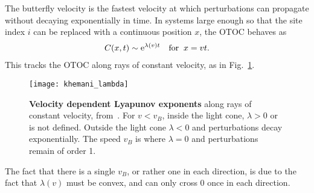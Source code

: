 The butterfly velocity is the fastest velocity at which perturbations can propagate without decaying exponentially in time. In systems large enough so that the site index $i$ can be replaced with a continuous position $x$, the OTOC behaves as~\cite{Khemani2018}
\begin{align}
C(x,t)\sim \text{e}^{\lambda(v)t}\quad\text{for}\;\;x=vt.\label{eqn:butterfly}
\end{align}
This tracks the OTOC along rays of constant velocity, as in Fig.~\ref{fig:khemani_lambda}.
\begin{figure}
	\centering
	\texttt{[image: khemani\_lambda]}
	\caption{\textbf{Velocity dependent Lyapunov exponents} along rays of constant velocity, from~\cite{Khemani2018}. For $v<v_B$, inside the light cone, $\lambda>0$ or is not defined. Outside the light cone $\lambda<0$ and perturbations decay exponentially. The speed $v_B$ is where $\lambda=0$ and perturbations remain of order 1.}
	\label{fig:khemani_lambda}
\end{figure}
The fact that there is a single $v_B$, or rather one in each direction, is due to the fact that $\lambda(v)$ must be convex, and can only cross 0 once in each direction.
